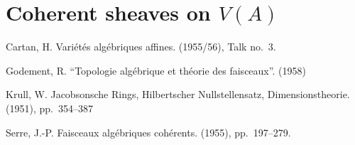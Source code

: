 \documentclass{article}
\theoremstyle{plain}
\newcommand{\oldpage}[1]{\marginpar{\footnotesize$\Big\vert$ \textit{p.~#1}}}
\begin{document}
\section{Coherent sheaves on $V(A)$}
\label{section4}

\oldpage{1-09}



\nocite{*}

\begin{thebibliography}{10}

  {\sc Cartan, H.}
  \newblock Vari\'{e}t\'{e}s alg\'{e}briques affines.
   (1955/56), Talk no.~3.

  {\sc Godement, R.}
  \newblock ``Topologie alg\'{e}brique et th\'{e}orie des faisceaux''.
   (1958)

  {\sc Krull, W.}
  \newblock Jacobsonsche Rings, Hilbertscher Nullstellensatz, Dimensionstheorie.
   (1951), pp.~354--387

  {\sc Serre, J.-P.}
  \newblock Faisceaux alg\'{e}briques coh\'{e}rents.
   (1955), pp.~197--279.

\end{thebibliography}
\end{document}
